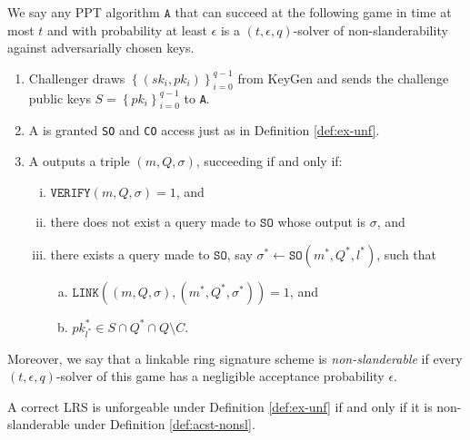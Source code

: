 \documentclass{llncs}
\begin{document}
\begin{definition}\label{def:acst-nonsl}
We say any PPT algorithm $\texttt{A}$ that can succeed at the following game in time at most $t$ and with probability at least $\epsilon$ is a $(t, \epsilon, q)$-solver of non-slanderability against adversarially chosen keys.
\begin{enumerate}
\item Challenger draws $\left\{(sk_i, pk_i)\right\}_{i=0}^{q-1}$ from KeyGen and sends the challenge public keys $S = \left\{pk_i\right\}_{i=0}^{q-1}$ to \texttt{A}.

\item A is granted \texttt{SO} and \texttt{CO} access just as in Definition \ref{def:ex-unf}.

\item A outputs a triple $(m, Q, \sigma)$, succeeding if and only if:
    \begin{enumerate}[(i)]
    \item $\texttt{VERIFY}(m, Q, \sigma) = 1$, and

    \item there does not exist a query made to $\texttt{SO}$ whose output is $\sigma$, and

    \item there exists a query made to $\texttt{SO}$, say $\sigma^* \leftarrow \texttt{SO}(m^*, Q^*, l^*)$, such that
        \begin{enumerate}[(a)]
        \item $\texttt{LINK}((m, Q, \sigma), (m^*, Q^*, \sigma^*)) = 1$, and

        \item $pk^*_{l^*} \in S \cap Q^* \cap Q \setminus C$.
        \end{enumerate}
    \end{enumerate}
\end{enumerate}
Moreover, we say that a linkable ring signature scheme is \textit{non-slanderable} if every $(t, \epsilon, q)$-solver of this game has a negligible acceptance probability $\epsilon$.
\end{definition}

\begin{theorem}\label{thm:nonsl-implies-unf}
A correct LRS is unforgeable under Definition \ref{def:ex-unf} if and only if it is non-slanderable under Definition \ref{def:acst-nonsl}.
\end{theorem}
\end{document}

